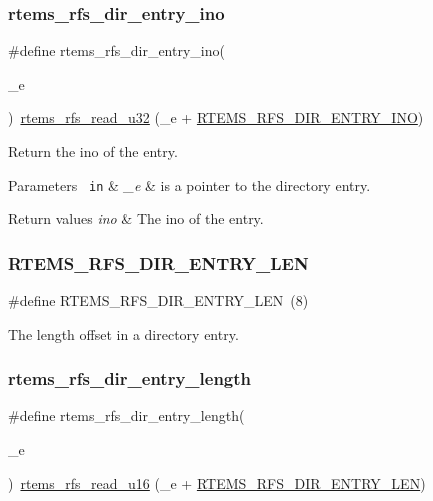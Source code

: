 \subsubsection{\texorpdfstring{rtems\_rfs\_dir\_entry\_ino}{rtems\_rfs\_dir\_entry\_ino}}
{\footnotesize\ttfamily \#define rtems\+\_\+rfs\+\_\+dir\+\_\+entry\+\_\+ino(\begin{DoxyParamCaption}\item[{}]{\+\_\+e }\end{DoxyParamCaption})~\mbox{\hyperlink{rtems-rfs-data_8h_ae061f1784ebeef490293e0080740041a}{rtems\+\_\+rfs\+\_\+read\+\_\+u32}} (\+\_\+e + \mbox{\hyperlink{rtems-rfs-dir_8h_a0b52d37896f9be61b9946bc726aecd4d}{R\+T\+E\+M\+S\+\_\+\+R\+F\+S\+\_\+\+D\+I\+R\+\_\+\+E\+N\+T\+R\+Y\+\_\+\+I\+NO}})}

Return the ino of the entry.


\begin{DoxyParams}[1]{Parameters}
\mbox{\texttt{ in}}  & {\em \+\_\+e} & is a pointer to the directory entry.\\
\hline
\end{DoxyParams}

\begin{DoxyRetVals}{Return values}
{\em ino} & The ino of the entry. \\
\hline
\end{DoxyRetVals}
\mbox{\label{rtems-rfs-dir_8h_ab32ed76f1463d9de333a986fd2290f8f}} 
\subsubsection{\texorpdfstring{RTEMS\_RFS\_DIR\_ENTRY\_LEN}{RTEMS\_RFS\_DIR\_ENTRY\_LEN}}
{\footnotesize\ttfamily \#define R\+T\+E\+M\+S\+\_\+\+R\+F\+S\+\_\+\+D\+I\+R\+\_\+\+E\+N\+T\+R\+Y\+\_\+\+L\+EN~(8)}

The length offset in a directory entry. \mbox{\label{rtems-rfs-dir_8h_a33fdddc3d6b082731e449cb18d008264}} 
\subsubsection{\texorpdfstring{rtems\_rfs\_dir\_entry\_length}{rtems\_rfs\_dir\_entry\_length}}
{\footnotesize\ttfamily \#define rtems\+\_\+rfs\+\_\+dir\+\_\+entry\+\_\+length(\begin{DoxyParamCaption}\item[{}]{\+\_\+e }\end{DoxyParamCaption})~\mbox{\hyperlink{rtems-rfs-data_8h_a602400ac127a6614ac1e16f322df3f0b}{rtems\+\_\+rfs\+\_\+read\+\_\+u16}} (\+\_\+e + \mbox{\hyperlink{rtems-rfs-dir_8h_ab32ed76f1463d9de333a986fd2290f8f}{R\+T\+E\+M\+S\+\_\+\+R\+F\+S\+\_\+\+D\+I\+R\+\_\+\+E\+N\+T\+R\+Y\+\_\+\+L\+EN}})}

